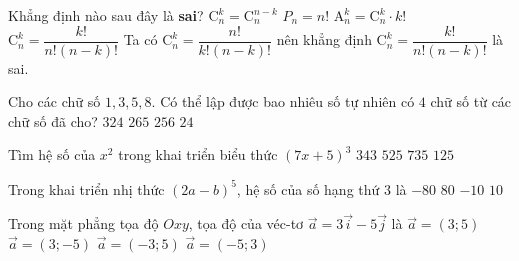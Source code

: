 \begin{ex}%
	Khẳng định nào sau đây là \textbf{sai}?
	\choice
	{$\mathrm{C}_n^k=\mathrm{C}_n^{n-k}$}
	{$P_n=n!$}
	{$\mathrm{A}_n^k=\mathrm{C}_n^k\cdot k!$}
	{\True $\mathrm{C}_n^k=\dfrac{k!}{n!(n-k)!}$}
	\loigiai
	{
		Ta có $\mathrm{C}_n^k=\dfrac{n!}{k!(n-k)!}$ nên khẳng định $\mathrm{C}_n^k=\dfrac{k!}{n!(n-k)!}$ là sai.
	}
\end{ex}

\begin{ex}%
	Cho các chữ số $1,3,5,8$. Có thể lập được bao nhiêu số tự nhiên có $4$ chữ số từ các chữ số đã cho?
	\choice
	{$324$}
	{$265$}
	{$256$}
	{\True $24$}
\end{ex}

\begin{ex}%
	Tìm hệ số của $x^2$  trong khai triển biểu thức $(7x + 5)^{3}$
	\choice
	{$343$}
	{$525$}
	{\True $735$}
	{$125$}
\end{ex}

\begin{ex}%
	Trong khai triển nhị thức $(2a-b)^5$, hệ số của số hạng thứ $3$ là
	\choice
	{$-80 $}
	{\True$80$}
	{$-10$}
	{$10$}
\end{ex}

\begin{ex}%
	Trong mặt phẳng tọa độ $Oxy$, tọa độ của véc-tơ $\overrightarrow{a}=3\overrightarrow{i}-5\overrightarrow{j}$ là
	\choice
	{$\overrightarrow{a}=(3;5)$}
	{\True $\overrightarrow{a}=(3;-5)$}
	{$\overrightarrow{a}=(-3;5)$}
	{$\overrightarrow{a}=(-5;3)$}
\end{ex}

